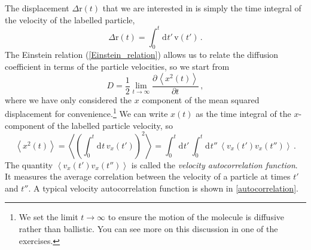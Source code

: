 \documentclass{article}
\theoremstyle{plain}\theoremheaderfont{\normalfont\bfseries}\theorembodyfont{\rmfamily}\theoremseparator{.}\newtheorem*{thm}{Theorem}\newtheorem*{law}{Law}\newtheorem*{pos}{Postulate}
\numberwithin{equation}{section}
\newcommand{\dd}[2][]{\mathrm{d}^{#1} #2\,}
\newcommand{\pdv}[3][]{\frac{\partial^{#1} #2}{{\partial #3}^{#1}}}
\newcommand{\eval}[1]{\left\langle #1 \right\rangle}
\newcommand{\vb}[1]{\bm{\mathrm{#1}}}
\begin{document}
    The displacement \(\Delta\vb{r}(t)\) that we are interested in is simply the time integral of the velocity of the labelled particle,
    \begin{equation}
        \Delta\vb{r}(t)=\int_{0}^{t}\dd{t'}\vb{v}(t')\,.
    \end{equation}
    The Einstein relation (\ref{Einstein_relation}) allows us to relate the diffusion coefficient in terms of the particle velocities, so we start from
    \begin{equation}
        D=\frac{1}{2}\lim_{t\to\infty}\pdv{\eval{x^2(t)}}{t}\,,
    \end{equation}
    where we have only considered the \(x\) component of the mean squared displacement for convenience.\footnote{We set the limit \(t\to\infty\) to ensure the motion of the molecule is diffusive rather than ballistic. You can see more on this discussion in one of the exercises.} We can write \(x(t)\) as the time integral of the \(x\)-component of the labelled particle velocity, so
    \begin{equation}
        \eval{x^2(t)}=\eval{\left(\int_{0}^{t}\dd{t}v_x(t')\right)^2}=\int_{0}^{t}\dd{t'}\int_{0}^{t}\dd{t''}\eval{v_x(t')v_x(t'')}\,.
    \end{equation}
    The quantity \(\eval{v_x(t')v_x(t'')}\) is called the \textit{velocity autocorrelation function}. It measures the average correlation between the velocity of a particle at times \(t'\) and \(t''\). A typical velocity autocorrelation function is shown in \cref{autocorrelation}.
\end{document}
